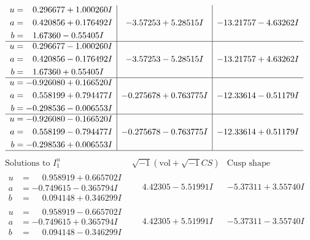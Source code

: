 \documentclass[1p]{elsarticle_modified}
\theoremstyle{definition}
\newcommand{\I}{\sqrt{-1}}
\begin{document}
$$\begin{array}{c|c|c}
\begin{aligned}
u &= \phantom{-}0.296677 + 1.000260 I \\
a &= \phantom{-}0.420856 + 0.176492 I \\
b &= \phantom{-}1.67360 - 0.55405 I\end{aligned}
 & -3.57253 + 5.28515 I & -13.21757 - 4.63262 I \\ \hline\begin{aligned}
u &= \phantom{-}0.296677 - 1.000260 I \\
a &= \phantom{-}0.420856 - 0.176492 I \\
b &= \phantom{-}1.67360 + 0.55405 I\end{aligned}
 & -3.57253 - 5.28515 I & -13.21757 + 4.63262 I \\ \hline\begin{aligned}
u &= -0.926080 + 0.166520 I \\
a &= \phantom{-}0.558199 + 0.794477 I \\
b &= -0.298536 - 0.006553 I\end{aligned}
 & -0.275678 + 0.763775 I & -12.33614 - 0.51179 I \\ \hline\begin{aligned}
u &= -0.926080 - 0.166520 I \\
a &= \phantom{-}0.558199 - 0.794477 I \\
b &= -0.298536 + 0.006553 I\end{aligned}
 & -0.275678 - 0.763775 I & -12.33614 + 0.51179 I\\
 \hline 
 \end{array}$$\newpage$$\begin{array}{c|c|c}  
\text{Solutions to }I^u_{1}& \I (\text{vol} + \sqrt{-1}CS) & \text{Cusp shape}\\
 \hline 
\begin{aligned}
u &= \phantom{-}0.958919 + 0.665702 I \\
a &= -0.749615 - 0.365794 I \\
b &= \phantom{-}0.094148 + 0.346299 I\end{aligned}
 & \phantom{-}4.42305 - 5.51991 I & -5.37311 + 3.55740 I \\ \hline\begin{aligned}
u &= \phantom{-}0.958919 - 0.665702 I \\
a &= -0.749615 + 0.365794 I \\
b &= \phantom{-}0.094148 - 0.346299 I\end{aligned}
 & \phantom{-}4.42305 + 5.51991 I & -5.37311 - 3.55740 I \\ \hline\begin{aligned}

\end{aligned}
\end{array}$$
\end{document}
